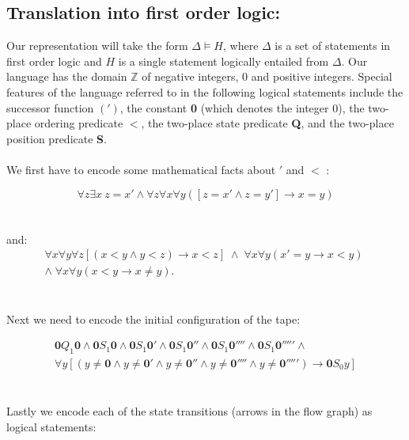 \documentclass[a4paper,11pt]{article}
\begin{document}
\bigskip

\subsection*{Translation into first order logic:}

\bigskip

Our representation will take the form $\Delta \models H$, where $\Delta$ is a set of statements in 
first order logic and $H$ is a single statement logically entailed from $\Delta$. Our language has 
the domain $\mathbb{Z}$ of negative integers, 0 and positive integers. Special features of the language
referred to in the following logical statements include the successor function $(')$, the constant \textbf{0}
(which denotes the integer 0), the two-place ordering predicate $<$, the two-place state predicate \textbf{Q}, 
and the two-place position predicate \textbf{S}.
\\\\
We first have to encode some mathematical facts about $'$ and $<$ :

\begin{equation}
\forall z \exists x \: z=x' \land \forall z \forall x \forall y ([z=x' \land z=y'] \rightarrow x = y) 
\end{equation}	
\\\\
and:
\begin{multline}
\forall x \forall y \forall z [(x<y \land y<z) \rightarrow x<z] \; \land \; \forall x \forall y (x'=y \rightarrow x<y) 
\; \\ \land \; \forall x \forall y (x<y \rightarrow x \neq y).
\end{multline}
\\\\
Next we need to encode the initial configuration of the tape:


\begin{multline}
\textbf{0} Q_{1} \textbf{0} \land \textbf{0} S_{1} \textbf{0} \land \textbf{0} S_{1} \textbf{0}' \land
\textbf{0} S_{1} \textbf{0}'' \land \textbf{0} S_{1} \textbf{0}'''' \land \textbf{0} S_{1} \textbf{0}''''' \land \\
\forall y [(y \neq \textbf{0} \land y \neq \textbf{0}' \land y \neq \textbf{0}'' \land y \neq \textbf{0}'''' 
\land y \neq \textbf{0}''''') \rightarrow \textbf{0}S_{0}y]
\end{multline}
\\\\
Lastly we encode each of the state transitions (arrows in the flow graph) as logical statements:
\end{document}
